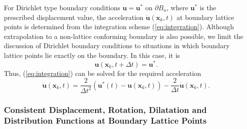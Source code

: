 \documentclass{article}
\renewcommand{\vec}{\boldsymbol}        %
\begin{document}
For Dirichlet type boundary conditions $\vec{u}=\vec{u}^*$ on $\partial{B}_{{u}}$, where $\vec{u}^*$ is the prescribed displacement value, the acceleration $\ddot{\vec{u}}(\vec{x}_k,t)$ at boundary lattice points is determined from the integration scheme (\ref{eq:integration}). Although extrapolation to a non-lattice conforming boundary is also possible, we limit the discussion of Dirichlet boundary conditions to situations in which boundary lattice points lie exactly on the boundary. In this case, it is 
\begin{equation}
    \vec{u}(\vec{x}_k,t+\Delta{t}) = \vec{u}^*.
\end{equation}
Thus, (\ref{eq:integration}) can be solved for the required acceleration 
\begin{equation}
    \ddot{\vec{u}}({\vec{x}_k,t}) = \dfrac{2}{\Delta{t}^2}(\vec{u}^*(t)-\vec{u}(\vec{x}_k,t))-\dfrac{2}{\Delta{t}}\dot{\vec{u}}(\vec{x}_k,t).
    \label{eq:acc_dirichlet}
\end{equation}

\subsubsection{Consistent Displacement, Rotation, Dilatation and Distribution Functions at Boundary Lattice Points}
\end{document}
